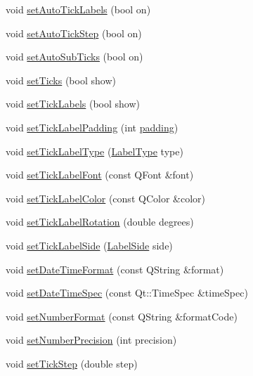 \begin{DoxyCompactItemize}
\item 
void \hyperlink{class_q_c_p_axis_aaa47e3a6bac0c20d4beb9028f01bc1a1}{set\+Auto\+Tick\+Labels} (bool on)
\item 
void \hyperlink{class_q_c_p_axis_a99fe77b034e06f5b723995beab96e741}{set\+Auto\+Tick\+Step} (bool on)
\item 
void \hyperlink{class_q_c_p_axis_adcbdec7a60054b88571e89599f4a45bf}{set\+Auto\+Sub\+Ticks} (bool on)
\item 
void \hyperlink{class_q_c_p_axis_ac891409315bc379e3b1abdb162c1a011}{set\+Ticks} (bool show)
\item 
void \hyperlink{class_q_c_p_axis_a04ba16e1f6f78d70f938519576ed32c8}{set\+Tick\+Labels} (bool show)
\item 
void \hyperlink{class_q_c_p_axis_af302c479af9dbc2e9f0e44e07c0012ee}{set\+Tick\+Label\+Padding} (int \hyperlink{class_q_c_p_axis_abb85015a9467ec176e70698307ec833a}{padding})
\item 
void \hyperlink{class_q_c_p_axis_a54f24f5ce8feea25209388a863d7e448}{set\+Tick\+Label\+Type} (\hyperlink{class_q_c_p_axis_a4a7da0166f755f5abac23b765d184cad}{Label\+Type} type)
\item 
void \hyperlink{class_q_c_p_axis_a2b8690c4e8dbc39d9185d2b398ce7a6c}{set\+Tick\+Label\+Font} (const Q\+Font \&font)
\item 
void \hyperlink{class_q_c_p_axis_a395e445c3fe496b935bee7b911ecfd1c}{set\+Tick\+Label\+Color} (const Q\+Color \&color)
\item 
void \hyperlink{class_q_c_p_axis_a1bddd4413df8a576b7ad4b067fb33375}{set\+Tick\+Label\+Rotation} (double degrees)
\item 
void \hyperlink{class_q_c_p_axis_a13ec644fc6e22715744c92c6dfa4f0fa}{set\+Tick\+Label\+Side} (\hyperlink{class_q_c_p_axis_a24b13374b9b8f75f47eed2ea78c37db9}{Label\+Side} side)
\item 
void \hyperlink{class_q_c_p_axis_a2ee0191daa03524a682113e63e05f7a7}{set\+Date\+Time\+Format} (const Q\+String \&format)
\item 
void \hyperlink{class_q_c_p_axis_a262e06731debed7eee11fa6a81d67eaf}{set\+Date\+Time\+Spec} (const Qt\+::\+Time\+Spec \&time\+Spec)
\item 
void \hyperlink{class_q_c_p_axis_ae585a54dc2aac662e90a2ca82f002590}{set\+Number\+Format} (const Q\+String \&format\+Code)
\item 
void \hyperlink{class_q_c_p_axis_a21dc8023ad7500382ad9574b48137e63}{set\+Number\+Precision} (int precision)
\item 
void \hyperlink{class_q_c_p_axis_af727db0acc6492c4c774c0700e738205}{set\+Tick\+Step} (double step)

\end{DoxyCompactItemize}
